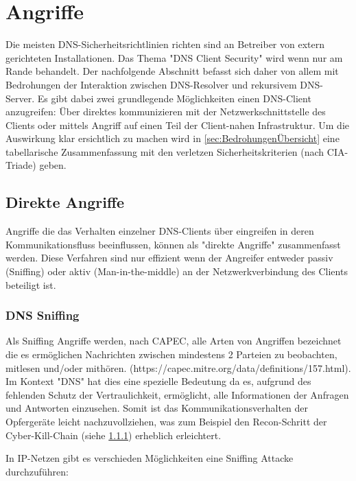 \chapter{Angriffe}

Die meisten DNS-Sicherheitsrichtlinien richten sind an Betreiber von extern gerichteten Installationen. Das Thema "DNS Client Security" wird wenn nur am Rande behandelt. Der nachfolgende Abschnitt befasst sich daher von allem mit Bedrohungen der Interaktion zwischen DNS-Resolver und rekursivem DNS-Server. 
Es gibt dabei zwei grundlegende Möglichkeiten einen DNS-Client anzugreifen: Über direktes kommunizieren mit der Netzwerkschnittstelle des Clients oder mittels Angriff auf einen Teil der Client-nahen Infrastruktur. Um die Auswirkung klar ersichtlich zu machen wird in \ref{sec:BedrohungenÜbersicht} eine tabellarische Zusammenfassung mit den verletzen Sicherheitskriterien (nach CIA-Triade) geben. 


\section{Direkte Angriffe}

Angriffe die das Verhalten einzelner DNS-Clients über eingreifen in deren Kommunikationsfluss beeinflussen, können als "direkte Angriffe" zusammenfasst werden. Diese Verfahren sind nur effizient wenn der Angreifer entweder passiv (Sniffing) oder aktiv (Man-in-the-middle) an der Netzwerkverbindung des Clients beteiligt ist. 

\subsection{DNS Sniffing}

Als Sniffing Angriffe werden, nach CAPEC, alle Arten von Angriffen bezeichnet die es ermöglichen Nachrichten zwischen mindestens 2 Parteien zu beobachten, mitlesen und/oder mithören. (https://capec.mitre.org/data/definitions/157.html). Im Kontext "DNS" hat dies eine spezielle Bedeutung da es, aufgrund des fehlenden Schutz der Vertraulichkeit, ermöglicht, alle Informationen der Anfragen und Antworten einzusehen. Somit ist das Kommunikationsverhalten der Opfergeräte leicht nachzuvollziehen, was zum Beispiel den Recon-Schritt der Cyber-Kill-Chain (siehe \ref{}) erheblich erleichtert. 

In IP-Netzen gibt es verschieden Möglichkeiten eine Sniffing Attacke durchzuführen: 

